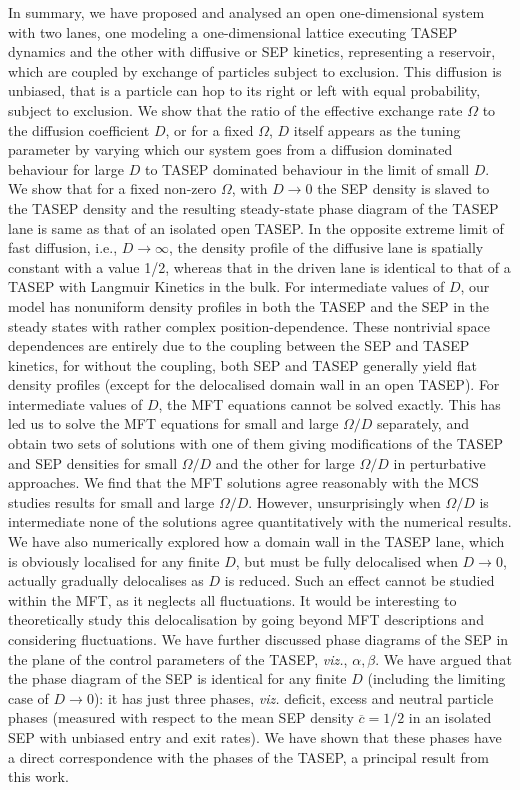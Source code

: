 \documentclass[aps,pre,twocolumn,superscriptaddress,amsmath,amssymb,longbibliography,floatfix,nofootinbib]{revtex4}
\begin{document}
{In summary, we have proposed and analysed an open one-dimensional system with two lanes, one modeling a 
one-dimensional lattice executing TASEP dynamics and the other with diffusive or SEP kinetics, representing a reservoir, which are coupled by exchange of
particles subject to exclusion. This diffusion is unbiased, that is a particle can hop to its right or left with equal probability, subject to exclusion. We show that the ratio of the effective exchange rate $\Omega$ to the diffusion coefficient $D$, or for a fixed $\Omega$, $D$ itself appears as
the tuning parameter by varying which our system goes from a diffusion
dominated behaviour for large $D$ to TASEP dominated behaviour in the limit of small $D$. We show that for a fixed non-zero $\Omega$, with $D\rightarrow0$
the SEP density is slaved to the TASEP density and the resulting
steady-state phase diagram of the TASEP lane is same as that of an isolated open TASEP. In the opposite extreme
limit of fast diffusion, i.e., $D \rightarrow \infty$, the density profile of the diffusive lane is spatially constant with a value 1/2,
whereas that in the  driven lane is identical to that of a TASEP with Langmuir Kinetics in the bulk.
For intermediate values of $D$, our model has nonuniform density profiles
in both the TASEP and the SEP  in the steady states with rather complex position-dependence. These nontrivial space dependences are entirely due to the coupling between the
SEP and TASEP kinetics, for without the coupling, both SEP and TASEP generally yield
flat density profiles (except for the delocalised domain wall in an open TASEP). For intermediate values of $D$, the MFT equations cannot be solved exactly. This has led us to solve the MFT equations for small and large $\Omega/D$ separately, and obtain two sets of solutions with one of them giving modifications of the  TASEP and SEP densities for small $\Omega/D$ and the other for large $\Omega/D$ in perturbative approaches. We find that the MFT solutions agree reasonably with the MCS studies results for small and large $\Omega/D$. However, unsurprisingly when $\Omega/D$ is intermediate none of the solutions agree quantitatively with the numerical results. We have also numerically explored how a domain wall in the TASEP lane, which is obviously localised for any finite $D$, but must be fully delocalised when $D\to 0$, actually gradually delocalises as $D$ is reduced. Such an effect cannot be studied within the MFT, as it neglects all fluctuations. It would be interesting to  theoretically  study this delocalisation by going beyond MFT descriptions and considering fluctuations. We have further discussed phase diagrams of the SEP in the plane of the control parameters of the TASEP, {\em viz.}, $\alpha,\beta$. We have argued that the phase diagram of the SEP is identical for any finite $D$ (including the limiting case of $D\rightarrow 0$): it has just three phases, {\em viz.} deficit, excess and neutral particle phases (measured with respect to the mean SEP density $\overline c=1/2$ in an isolated SEP with unbiased entry and exit rates). We have shown that these phases have a direct correspondence with the phases of the TASEP, a principal result from this work. 
}
\end{document}
